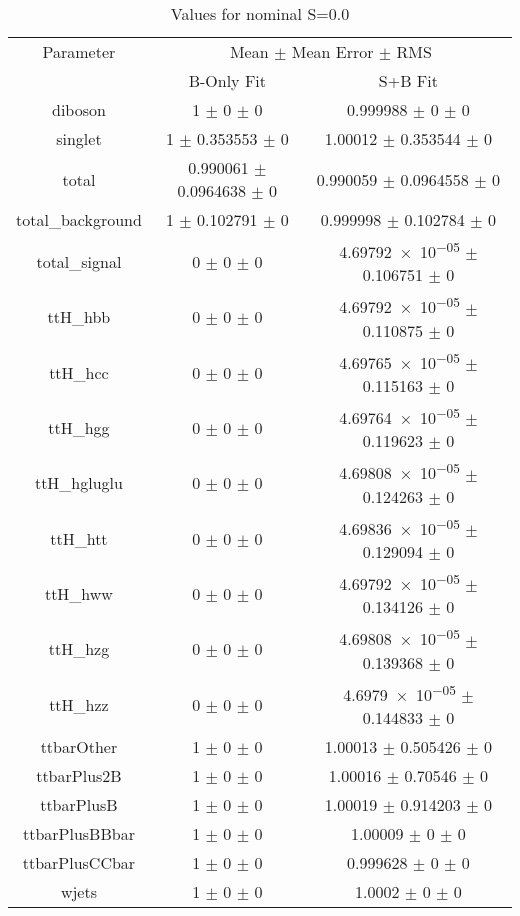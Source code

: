 \begin{table}
\centering
\caption{Values for nominal S=0.0}
\begin{tabular}{ccc}
\toprule
Parameter & \multicolumn{2}{c}{Mean $\pm$ Mean Error $\pm$ RMS}\\
 & B-Only Fit & S+B Fit\\
\midrule
diboson & \num{1} $\pm$ \num{0} $\pm$ \num{0} & \num{0.999988} $\pm$ \num{0} $\pm$ \num{0}\\
singlet & \num{1} $\pm$ \num{0.353553} $\pm$ \num{0} & \num{1.00012} $\pm$ \num{0.353544} $\pm$ \num{0}\\
total & \num{0.990061} $\pm$ \num{0.0964638} $\pm$ \num{0} & \num{0.990059} $\pm$ \num{0.0964558} $\pm$ \num{0}\\
total\_background & \num{1} $\pm$ \num{0.102791} $\pm$ \num{0} & \num{0.999998} $\pm$ \num{0.102784} $\pm$ \num{0}\\
total\_signal & \num{0} $\pm$ \num{0} $\pm$ \num{0} & \num{4.69792e-05} $\pm$ \num{0.106751} $\pm$ \num{0}\\
ttH\_hbb & \num{0} $\pm$ \num{0} $\pm$ \num{0} & \num{4.69792e-05} $\pm$ \num{0.110875} $\pm$ \num{0}\\
ttH\_hcc & \num{0} $\pm$ \num{0} $\pm$ \num{0} & \num{4.69765e-05} $\pm$ \num{0.115163} $\pm$ \num{0}\\
ttH\_hgg & \num{0} $\pm$ \num{0} $\pm$ \num{0} & \num{4.69764e-05} $\pm$ \num{0.119623} $\pm$ \num{0}\\
ttH\_hgluglu & \num{0} $\pm$ \num{0} $\pm$ \num{0} & \num{4.69808e-05} $\pm$ \num{0.124263} $\pm$ \num{0}\\
ttH\_htt & \num{0} $\pm$ \num{0} $\pm$ \num{0} & \num{4.69836e-05} $\pm$ \num{0.129094} $\pm$ \num{0}\\
ttH\_hww & \num{0} $\pm$ \num{0} $\pm$ \num{0} & \num{4.69792e-05} $\pm$ \num{0.134126} $\pm$ \num{0}\\
ttH\_hzg & \num{0} $\pm$ \num{0} $\pm$ \num{0} & \num{4.69808e-05} $\pm$ \num{0.139368} $\pm$ \num{0}\\
ttH\_hzz & \num{0} $\pm$ \num{0} $\pm$ \num{0} & \num{4.6979e-05} $\pm$ \num{0.144833} $\pm$ \num{0}\\
ttbarOther & \num{1} $\pm$ \num{0} $\pm$ \num{0} & \num{1.00013} $\pm$ \num{0.505426} $\pm$ \num{0}\\
ttbarPlus2B & \num{1} $\pm$ \num{0} $\pm$ \num{0} & \num{1.00016} $\pm$ \num{0.70546} $\pm$ \num{0}\\
ttbarPlusB & \num{1} $\pm$ \num{0} $\pm$ \num{0} & \num{1.00019} $\pm$ \num{0.914203} $\pm$ \num{0}\\
ttbarPlusBBbar & \num{1} $\pm$ \num{0} $\pm$ \num{0} & \num{1.00009} $\pm$ \num{0} $\pm$ \num{0}\\
ttbarPlusCCbar & \num{1} $\pm$ \num{0} $\pm$ \num{0} & \num{0.999628} $\pm$ \num{0} $\pm$ \num{0}\\
wjets & \num{1} $\pm$ \num{0} $\pm$ \num{0} & \num{1.0002} $\pm$ \num{0} $\pm$ \num{0}\\
\bottomrule
\end{tabular}
\end{table}